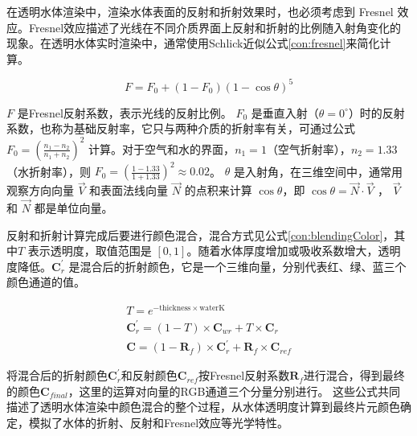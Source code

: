 在透明水体渲染中，渲染水体表面的反射和折射效果时，也必须考虑到 Fresnel 效应。Fresnel效应描述了光线在不同介质界面上反射和折射的比例随入射角变化的现象。在透明水体实时渲染中，通常使用Schlick近似公式\ref{con:fresnel}来简化计算。

\begin{equation}
    F = F_0+(1 - F_0)(1 - \cos\theta)^5
    \label{con:fresnel}
\end{equation}

$F$ 是Fresnel反射系数，表示光线的反射比例。
$F_0$ 是垂直入射（$\theta = 0^{\circ}$）时的反射系数，也称为基础反射率，它只与两种介质的折射率有关，可通过公式 $F_0=\left(\frac{n_1 - n_2}{n_1 + n_2}\right)^2$ 计算。对于空气和水的界面，$n_1 = 1$（空气折射率），$n_2 = 1.33$（水折射率），则 $F_0=\left(\frac{1 - 1.33}{1 + 1.33}\right)^2\approx0.02$。
$\theta$ 是入射角，在三维空间中，通常用观察方向向量 $\vec{V}$ 和表面法线向量 $\vec{N}$ 的点积来计算 $\cos\theta$，即 $\cos\theta=\vec{N}\cdot\vec{V}$ ， $\vec{V}$ 和 $\vec{N}$ 都是单位向量。

反射和折射计算完成后要进行颜色混合，混合方式见公式\ref{con:blendingColor}，其中$T$ 表示透明度，取值范围是 $[0, 1]$。随着水体厚度增加或吸收系数增大，透明度降低。$\mathbf{C}_{r}^{'}$ 是混合后的折射颜色，它是一个三维向量，分别代表红、绿、蓝三个颜色通道的值。

\begin{equation}
    \begin{aligned}
    T = e^{- \text{thickness} \times \text{waterK}} \\
    \mathbf{C}_{r}^{'}=(1 - T)\times\mathbf{C}_{wr}+T\times\mathbf{C}_{r}\\
    \mathbf{C}=(1 - \mathbf{R}_{f})\times\mathbf{C}_{r}^{'}+\mathbf{R}_{f}\times\mathbf{C}_{ref}
    \end{aligned}
    \label{con:blendingColor}
\end{equation}

将混合后的折射颜色$\mathbf{C}_{r}^{'}$和反射颜色$\mathbf{C}_{ref}$按Fresnel反射系数$\mathbf{R}_{f}$进行混合，得到最终的颜色$\mathbf{C}_{final}$，这里的运算对向量的RGB通道三个分量分别进行。
这些公式共同描述了透明水体渲染中颜色混合的整个过程，从水体透明度计算到最终片元颜色确定，模拟了水体的折射、反射和Fresnel效应等光学特性。

